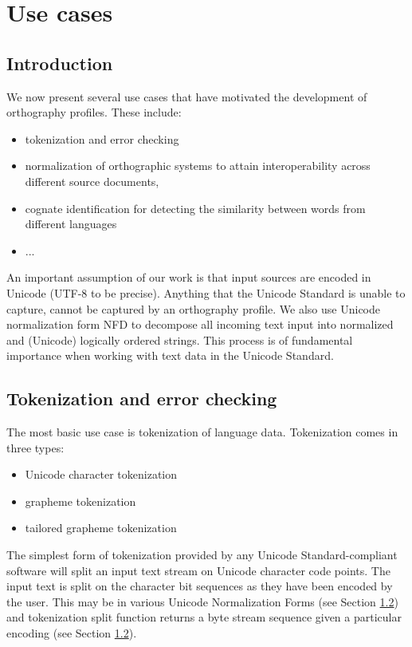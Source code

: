 \chapter{Use cases}
\label{use-cases}

\section{Introduction}

We now present several use cases that have motivated the development of
orthography profiles. These include: 

\begin{itemize}
	\item tokenization and error checking
	\item normalization of orthographic systems to attain interoperability across different source documents, 
	\item cognate identification for detecting the similarity between words from different languages 
	\item ...
\end{itemize}

An important assumption of our work is that input sources are encoded in Unicode
(UTF-8 to be precise). Anything that the Unicode Standard is unable to capture,
cannot be captured by an orthography profile. We also use Unicode normalization
form NFD to decompose all incoming text input into normalized and (Unicode)
logically ordered strings. This process is of fundamental importance when
working with text data in the Unicode Standard.

\section{Tokenization and error checking} The most basic use case is
tokenization of language data. Tokenization comes in three types:

\begin{itemize}
	\item Unicode character tokenization
	\item grapheme tokenization
	\item tailored grapheme tokenization
\end{itemize}
	
The simplest form of tokenization provided by any Unicode Standard-compliant
software will split an input text stream on Unicode character code points. The
input text is split on the character bit sequences as they have been encoded by
the user. This may be in various Unicode Normalization Forms (see Section
\ref{}) and tokenization split function returns a byte stream sequence given a
particular encoding (see Section \ref{}).

